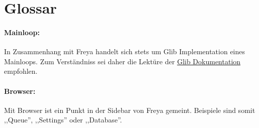 \newpage
\section{Glossar}
\paragraph{Mainloop:}
In Zusammenhang mit Freya handelt sich stets um Glib Implementation eines Mainloops.
Zum Verständniss sei daher die Lektüre der \href{http://developer.gnome.org/glib/2.30/glib-The-Main-Event-Loop.html#glib-The-Main-Event-Loop.description}{Glib Dokumentation} empfohlen.
\paragraph{Browser:}
Mit Browser ist ein Punkt in der Sidebar von Freya gemeint. Beispiele sind somit ,,Queue'', ,,Settings'' oder ,,Database''.

